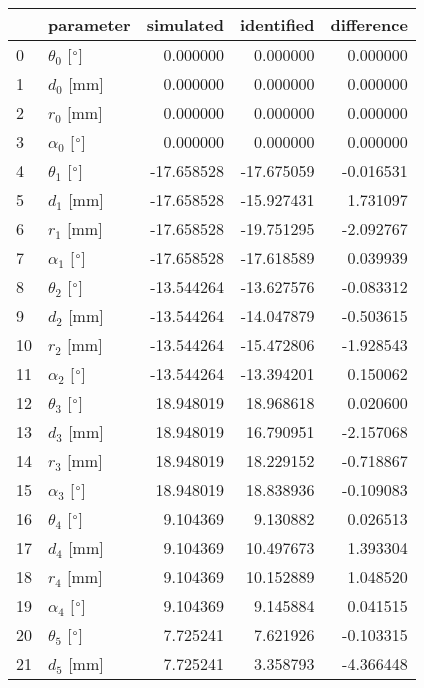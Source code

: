 \documentclass{standalone}%
\begin{document}
%
\normalsize%
\begin{tabular}{llrrr}
\toprule
{} &                 parameter &  simulated & identified & difference \\
\midrule
0  &  $\theta_{0}$ [$\degree$] &   0.000000 &   0.000000 &   0.000000 \\
1  &              $d_{0}$ [mm] &   0.000000 &   0.000000 &   0.000000 \\
2  &              $r_{0}$ [mm] &   0.000000 &   0.000000 &   0.000000 \\
3  &  $\alpha_{0}$ [$\degree$] &   0.000000 &   0.000000 &   0.000000 \\
4  &  $\theta_{1}$ [$\degree$] & -17.658528 & -17.675059 &  -0.016531 \\
5  &              $d_{1}$ [mm] & -17.658528 & -15.927431 &   1.731097 \\
6  &              $r_{1}$ [mm] & -17.658528 & -19.751295 &  -2.092767 \\
7  &  $\alpha_{1}$ [$\degree$] & -17.658528 & -17.618589 &   0.039939 \\
8  &  $\theta_{2}$ [$\degree$] & -13.544264 & -13.627576 &  -0.083312 \\
9  &              $d_{2}$ [mm] & -13.544264 & -14.047879 &  -0.503615 \\
10 &              $r_{2}$ [mm] & -13.544264 & -15.472806 &  -1.928543 \\
11 &  $\alpha_{2}$ [$\degree$] & -13.544264 & -13.394201 &   0.150062 \\
12 &  $\theta_{3}$ [$\degree$] &  18.948019 &  18.968618 &   0.020600 \\
13 &              $d_{3}$ [mm] &  18.948019 &  16.790951 &  -2.157068 \\
14 &              $r_{3}$ [mm] &  18.948019 &  18.229152 &  -0.718867 \\
15 &  $\alpha_{3}$ [$\degree$] &  18.948019 &  18.838936 &  -0.109083 \\
16 &  $\theta_{4}$ [$\degree$] &   9.104369 &   9.130882 &   0.026513 \\
17 &              $d_{4}$ [mm] &   9.104369 &  10.497673 &   1.393304 \\
18 &              $r_{4}$ [mm] &   9.104369 &  10.152889 &   1.048520 \\
19 &  $\alpha_{4}$ [$\degree$] &   9.104369 &   9.145884 &   0.041515 \\
20 &  $\theta_{5}$ [$\degree$] &   7.725241 &   7.621926 &  -0.103315 \\
21 &              $d_{5}$ [mm] &   7.725241 &   3.358793 &  -4.366448 \\

\end{tabular}
\end{document}
